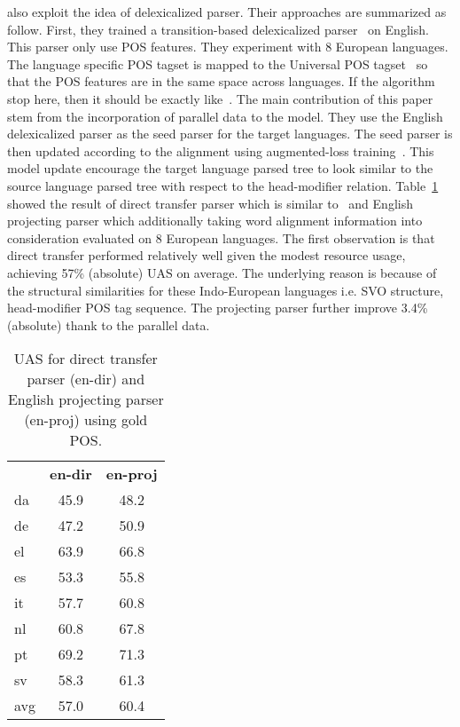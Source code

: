 \textbf{} also exploit the idea of delexicalized parser. Their approaches are summarized as follow. First, they trained a transition-based delexicalized parser~\cite{Nivre:2008:ADI} on English. This parser only use POS features. They experiment with 8 European languages. The language specific POS tagset is mapped to the Universal POS tagset~\cite{UniversalTagSet} so that the POS features are in the same space across languages. If the algorithm stop here, then it should be exactly like~. The main contribution of this paper stem from the incorporation of parallel data to the model. They use the English delexicalized parser as the seed parser for the target languages. The seed parser is then updated according to the alignment using augmented-loss training~\cite{Hall:2011:TDP:}. This model update encourage the target language parsed tree to look similar to the source language parsed tree with respect to the head-modifier relation. Table~\ref{tab:mcdonal11:proj} showed the result of direct transfer parser which is similar to~\cite{Zeman08cross-languageparser} and English projecting parser which additionally taking word alignment information into consideration evaluated on 8 European languages. The first observation is that direct transfer performed relatively well given the modest resource usage, achieving 57\% (absolute) UAS on average. The underlying reason is because of the structural similarities for these Indo-European languages i.e. SVO structure, head-modifier POS tag sequence. The projecting parser further improve 3.4\% (absolute) thank to the parallel data. 
\begin{table}
\centering 
\begin{tabular}{lcc}
    & \textbf{en-dir} & \textbf{en-proj} \\
da  & 45.9          & 48.2    \\
de  & 47.2          & 50.9    \\
el  & 63.9          & 66.8    \\
es  & 53.3          & 55.8    \\
it  & 57.7          & 60.8    \\
nl  & 60.8          & 67.8    \\
pt  & 69.2          & 71.3    \\
sv  & 58.3          & 61.3    \\
\hline
avg & 57.0          & 60.4   
\end{tabular}
\label{tab:mcdonal11:proj}
\caption{UAS for direct transfer parser (en-dir) and English projecting parser (en-proj) using gold POS.}
\end{table}

